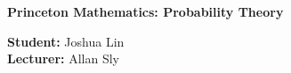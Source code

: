 





\begin{Large}
    \textsf{\textbf{Princeton Mathematics: Probability Theory}}
\end{Large}

\vspace{1ex}

\textsf{\textbf{Student:}} Joshua Lin \\
\textsf{\textbf{Lecturer:}} Allan Sly

\vspace{2ex}
















